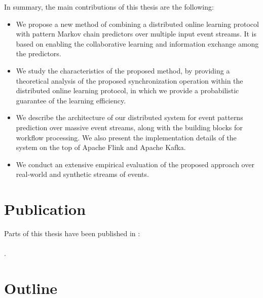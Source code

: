 In summary, the main contributions of this thesis are the following:

\begin{itemize}
	
	\item We propose a new method of combining a distributed online learning protocol with pattern Markov chain predictors over multiple input event streams. It is based on enabling the collaborative learning and information exchange among the predictors.  
	
	\item We study the characteristics of the proposed method, by providing a theoretical analysis of the proposed synchronization operation within the distributed online learning protocol, in which we provide a probabilistic guarantee of the learning efficiency. 
	
	\item We describe the architecture of our distributed system for event patterns prediction over massive event streams, along with the building blocks for workflow processing. We also present the implementation details of  the system on the top of Apache Flink and Apache Kafka. 
	
	\item We conduct an extensive empirical evaluation of the proposed approach over real-world and synthetic streams of events.
  
\end{itemize}


\section{Publication}

Parts of this thesis have been published in \cite{Qadah}:\\ \\
.

\section{Outline }

	
